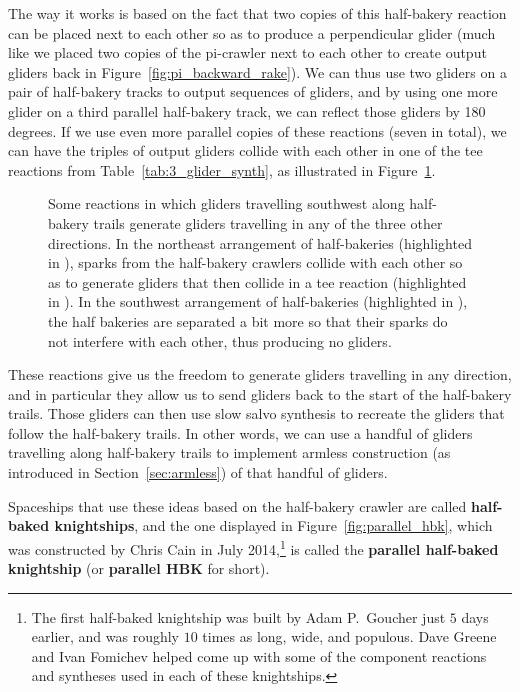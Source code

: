 The way it works is based on the fact that two copies of this half-bakery reaction can be placed next to each other so as to produce a perpendicular glider (much like we placed two copies of the pi-crawler next to each other to create output gliders back in Figure~\ref{fig:pi_backward_rake}). We can thus use two gliders on a pair of half-bakery tracks to output sequences of gliders, and by using one more glider on a third parallel half-bakery track, we can reflect those gliders by 180 degrees. If we use even more parallel copies of these reactions (seven in total), we can have the triples of output gliders collide with each other in one of the tee reactions from Table~\ref{tab:3_glider_synth}, as illustrated in Figure~\ref{fig:hbk_reactions}.

\begin{figure}[!htb]
	\centering
	\caption{Some reactions in which gliders travelling southwest along half-bakery trails generate gliders travelling in any of the three other directions. In the northeast arrangement of half-bakeries (highlighted in ), sparks from the half-bakery crawlers collide with each other so as to generate gliders that then collide in a tee reaction (highlighted in ). In the southwest arrangement of half-bakeries (highlighted in ), the half bakeries are separated a bit more so that their sparks do not interfere with each other, thus producing no gliders.}\label{fig:hbk_reactions}
\end{figure}

These reactions give us the freedom to generate gliders travelling in any direction, and in particular they allow us to send gliders back to the start of the half-bakery trails. Those gliders can then use slow salvo synthesis to recreate the gliders that follow the half-bakery trails. In other words, we can use a handful of gliders travelling along half-bakery trails to implement armless construction (as introduced in Section~\ref{sec:armless}) of that handful of gliders.

Spaceships that use these ideas based on the half-bakery crawler are called \textbf{half-baked knightships}, and the one displayed in Figure~\ref{fig:parallel_hbk}, which was constructed by Chris Cain in July 2014,\footnote{The first half-baked knightship was built by Adam P.~Goucher just $5$ days earlier, and was roughly $10$ times as long, wide, and populous. Dave Greene and Ivan Fomichev helped come up with some of the component reactions and syntheses used in each of these knightships.} is called the \textbf{parallel half-baked knightship} (or \textbf{parallel HBK} for short).

